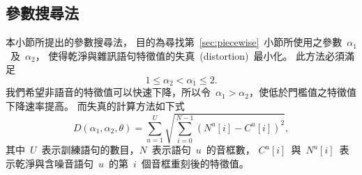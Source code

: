 \subsection{參數搜尋法}
\label{sec:algo}
本小節所提出的參數搜尋法，
目的為尋找第~\ref{sec:piecewise}~小節所使用之參數~$\alpha_1$~及~$\alpha_2$，
使得乾淨與雜訊語句特徵值的失真~(distortion)~最小化。
此方法必須滿足
\[
	1 \leq \alpha_2 < \alpha_1 \leq 2.
\]
我們希望非語音的特徵值可以快速下降，所以令~$\alpha_1 > \alpha_2$，使低於門檻值之特徵值下降速率提高。
而失真的計算方法如下式
\begin{equation}
\label{eq:distortion}
	D(\alpha_1, \alpha_2, \theta)= \sum_{u=1}^{U} \sqrt{\sum_{i=0}^{N-1} \left( N^u[i] - C^u[i] \right)^2 },
\end{equation}
其中~$U$~表示訓練語句的數目，$N$~表示語句~$u$~的音框數，
$C^u[i]$~與~$N^u[i]$~表示乾淨與含噪音語句~$u$~的第~$i$~個音框重刻後的特徵值。
